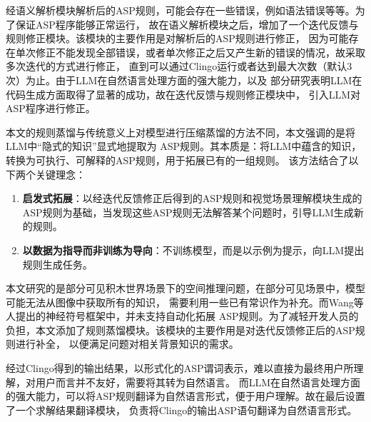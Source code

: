 经语义解析模块解析后的ASP规则，可能会存在一些错误，例如语法错误等等。为了保证ASP程序能够正常运行，
故在语义解析模块之后，增加了一个迭代反馈与规则修正模块。该模块的主要作用是对解析后的ASP规则进行修正，
因为可能存在单次修正不能发现全部错误，或者单次修正之后又产生新的错误的情况，故采取多次迭代的方式进行修正，
直到可以通过Clingo运行或者达到最大次数（默认3次）为止。由于LLM在自然语言处理方面的强大能力，以及
部分研究表明LLM在代码生成方面取得了显著的成功\cite{gao2023pal,he2023solving}，故在迭代反馈与规则修正模块中，
引入LLM对ASP程序进行修正。

本文的规则蒸馏与传统意义上对模型进行压缩蒸馏的方法不同，本文强调的是将LLM中“隐式的知识”显式地提取为
ASP规则。其本质是：将LLM中蕴含的知识，转换为可执行、可解释的ASP规则，用于拓展已有的一组规则。
该方法结合了以下两个关键理念：
\begin{enumerate}[nosep]
\item \textbf{启发式拓展}：以经迭代反馈修正后得到的ASP规则和视觉场景理解模块生成的ASP规则为基础，当发现这些ASP规则无法解答某个问题时，引导LLM生成新的规则。
\item \textbf{以数据为指导而非训练为导向}：不训练模型，而是以示例为提示，向LLM提出规则生成任务。
\end{enumerate}

本文研究的是部分可见积木世界场景下的空间推理问题，在部分可见场景中，模型可能无法从图像中获取所有的知识，
需要利用一些已有常识作为补充。而Wang\cite{wang2024dspy}等人提出的神经符号框架中，并未支持自动化拓展
ASP规则。为了减轻开发人员的负担，本文添加了规则蒸馏模块。该模块的主要作用是对迭代反馈修正后的ASP规则进行补全，
以便满足问题对相关背景知识的需求。

经过Clingo得到的输出结果，以形式化的ASP谓词表示，难以直接为最终用户所理解，对用户而言并不友好，需要将其转为自然语言。
而LLM在自然语言处理方面的强大能力，可以将ASP规则翻译为自然语言形式，便于用户理解。故在最后设置了一个求解结果翻译模块，
负责将Clingo的输出ASP语句翻译为自然语言形式。

